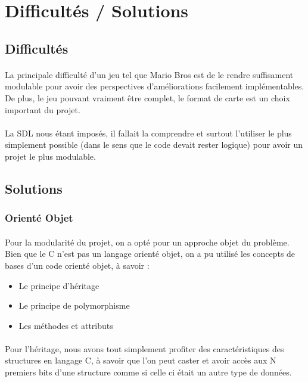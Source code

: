 \section{Difficultés / Solutions}

\subsection{Difficultés}
\paragraph{} La principale difficulté d'un jeu tel que Mario Bros est de le rendre suffisament modulable pour avoir des perspectives d'améliorations facilement implémentables. De plus, le jeu pouvant vraiment être complet, le format de carte est un choix important du projet.
\paragraph{} La SDL nous étant imposés, il fallait la comprendre et surtout l'utiliser le plus simplement possible (dans le sens que le code devait rester logique) pour avoir un projet le plus modulable.

\subsection{Solutions}
\subsubsection{Orienté Objet}

\paragraph{} Pour la modularité du projet, on a opté pour un approche objet du problème. Bien que le C n'est pas un langage orienté objet, on a pu utilisé les concepts de bases d'un code orienté objet, à savoir :
\begin{itemize}
	\item Le principe d'héritage
	\item Le principe de polymorphisme
	\item Les méthodes et attributs
\end{itemize}

\paragraph{} Pour l'héritage, nous avons tout simplement profiter des caractéristiques des structures en langage C, à savoir que l'on peut caster et avoir accès aux N premiers bits d'une structure comme si celle ci était un autre type de données.
